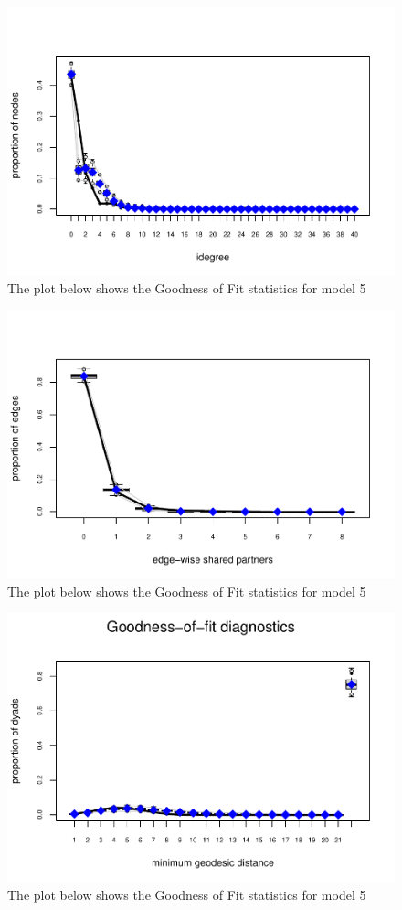 \documentclass[
  man,floatsintext]{apa6}
\begin{document}
\begin{figure}[H]
\includegraphics{SNA4DS_Report_files/figure-latex/gof-model5-3} \caption{The plot below shows the Goodness of Fit statistics for model 5}\label{fig:gof-model5-3}
\end{figure}
\begin{figure}[H]
\includegraphics{SNA4DS_Report_files/figure-latex/gof-model5-4} \caption{The plot below shows the Goodness of Fit statistics for model 5}\label{fig:gof-model5-4}
\end{figure}
\begin{figure}[H]
\includegraphics{SNA4DS_Report_files/figure-latex/gof-model5-5} \caption{The plot below shows the Goodness of Fit statistics for model 5}\label{fig:gof-model5-5}
\end{figure}
\end{document}
